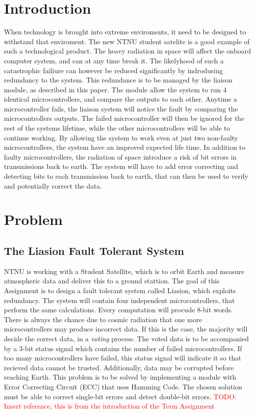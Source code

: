 \documentclass[a4paper]{IEEEtran}
\newcommand\TODO[1]{\textcolor{red}{TODO:#1}}
\newcommand\todo[1]{\TODO{#1}}
\begin{document}
\section{Introduction}
When technology is brought into extreme enviroments, it need to be designed to withstand that enviroment.
The new NTNU student satelite is a good example of such a technological product.
The heavy radiation in space will affect the onboard computer system, and can at any time break it.
The likelyhood of such a catastrophic failiure can however be reduced significantly by indrodusing redundancy to the system.
This redundance is to be managed by the liaison module, as described in this paper.
The module allow the system to run 4 identical microcontrollers, and compare the outputs to each other.
Anytime a microcontroller fails, the liaison system will notice the fault by comparing the microcontrollers outputs.
The failed microcontroller will then be ignored for the rest of the systems lifetime, while the other microcontrollers will be able to continue working.
By allowing the system to work even at just two non-faulty microcontrollers, the system have an improved expected life time.
In addition to faulty microcontrollers, the radiation of space introduce a risk of bit errors in transmissions back to earth.
The system will have to add error correcting and detecting bits to each transmission back to earth, that can then be used to verify and potentially correct the data.

\section{Problem}

\subsection{The Liasion Fault Tolerant System}
NTNU is working with a Student Satellite, which is to orbit Earth and measure atmospheric data and deliver this to a ground stattion.
The goal of this Assignment is to design a fault tolerant system called Liasion, which exploits redundancy.
The system will contain four independent microcontrollers, that perform the same calculations.
Every computation will procude 8-bit words.
There is always the chance due to cosmic radiation that one more microcontrollers may produce incorrect data.
If this is the case, the majority will decide the correct data, in a \textit{voting} process.
The voted data is to be accompanied by a 3-bit status signal which contains the number of failed microcontrollers.
If too many microcontrollers have failed, this status signal will indicate it so that recieved data cannot be trusted.
Additionally, data may be corrupted before reaching Earth.
This problem is to be solved by implementing a module with Error Correcting Circuit (ECC) that uses Hamming Code.
The chosen solution must be able to correct single-bit errors and detect double-bit errors.
\break 
\todo{ Insert reference, this is from the introduction of the Term Assignment}
\end{document}

